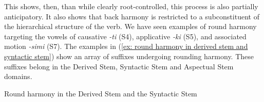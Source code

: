 This shows, then, than while clearly root-controlled, this process is also partially anticipatory. It also shows that back harmony is restricted to a subconstituent of the hierarchical structure of the verb. We have seen examples of round harmony targeting the vowels of causative \textit{-ti} (S4), applicative \textit{-ki} (S5), and associated motion \textit{-simi} (S7). The examples in (\ref{ex: round harmony in derived stem and syntactic stem}) show an array of suffixes undergoing rounding harmony. These suffixes belong in the Derived Stem, Syntactic Stem and Aspectual Stem domains.

\ea\label{ex: round harmony in derived stem and syntactic stem}
{Round harmony in the Derived Stem and the Syntactic Stem}

    \label{ex: round harmony in derived stem and syntactic stema}
        \label{ex: round harmony in derived stem and syntactic stemb}
            \label{ex: round harmony in derived stem and syntactic stemc}
